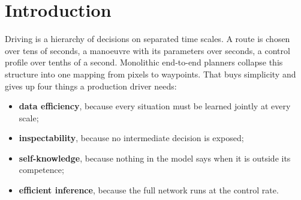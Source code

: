 \documentclass[10pt,twocolumn]{article}
\theoremstyle{remark}
\newcommand{\tier}[1]{\textsc{\small #1}}
\begin{document}
\begin{abstract}
types, two seeds each). Training on a quarter of the clips shows no measured cost ($+0.1108$\,m $[-0.1505,+0.3822]$, open) and an eighth does ($+0.4311$\,m $[+0.1627,+0.6845]$, DATA-SATURATED, KNEE-1/8; \tier{T1-kin}, six baseline seeds). In the deciding six-seed replicate the hierarchy is ahead of its flat control under the primary protocol, the own-state fine-tune ($-0.09$\,m on all windows and $-0.20$\,m on selection-critical windows, six of six seed differences negative, both intervals excluding zero); for training from scratch the comparison is not established. All of it rests on an evaluation
doctrine built for decisions rather than leaderboards: pre-registered bars with both outcomes committed, episode-cluster bootstrap
intervals, explicit seed variance and four metric families on every evaluation. We close with the remaining frontier (assertive
launch from standstill), the re-rendered simulation tier built to address it, and a research roadmap toward a 4B driver within a
budget of at most 800\,M parameters, deployable within 100\,ms on an edge computer.
\end{abstract}

\section{Introduction}
Driving is a hierarchy of decisions on separated time scales. A route is chosen over tens of seconds, a manoeuvre with its
parameters over seconds, a control profile over tenths of a second. Monolithic end-to-end planners collapse this structure into one
mapping from pixels to waypoints. That buys simplicity and gives up four things a production driver needs:
\begin{itemize}
  \item \textbf{data efficiency}, because every situation must be learned jointly at every scale;
  \item \textbf{inspectability}, because no intermediate decision is exposed;
  \item \textbf{self-knowledge}, because nothing in the model says when it is outside its competence;
  \item \textbf{efficient inference}, because the full network runs at the control rate.
\end{itemize}
\end{document}
